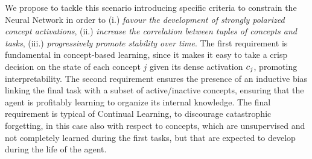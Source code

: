 %
We propose to tackle this scenario introducing specific criteria to constrain the Neural Network in order to (i.) \textit{favour the development of %
strongly polarized concept activations}, (ii.) \textit{increase the correlation between tuples of concepts and tasks}, (iii.) \textit{progressively promote stability over time}. The first requirement is fundamental in concept-based learning, since it makes it easy to take a crisp decision on the state of each concept $j$ given its dense activation ${c}_j$, promoting interpretability. The second requirement ensures the presence of an inductive bias linking the final task with a subset of active/inactive concepts, ensuring that the agent is profitably learning to organize its internal knowledge. The final requirement is typical of Continual Learning, to discourage catastrophic forgetting, %
in this case also with respect to concepts, which are unsupervised and not completely learned during the first tasks, but that are expected to develop during the life of the agent.

